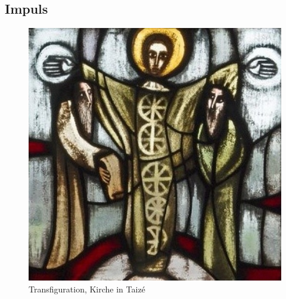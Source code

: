 \subsection{Impuls}
\begin{impuls}
\begin{figure}
    \centering
    \includegraphics[scale=0.5]
{Pictures/ob_468a26_transfiguration-taize-2.jpg}
    \caption{Transfiguration, Kirche in Taizé}
    \label{fig:Bildmeditation}
\end{figure}


\end{impuls}
